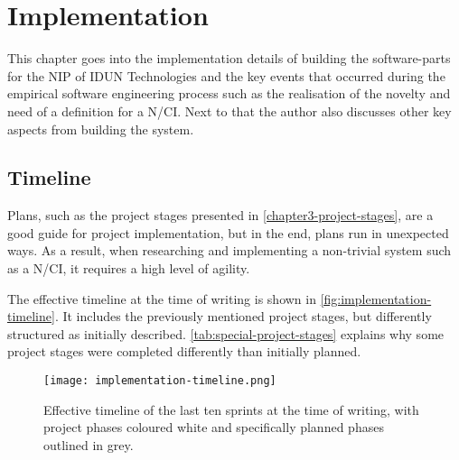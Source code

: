 \chapter{Implementation}
\graphicspath{{Chapter4/Figs/}{Chapter4/Figs/}}

This chapter goes into the implementation details of building the software-parts for the NIP of IDUN Technologies and the key events that occurred during the empirical software engineering process such as the realisation of the novelty and need of a definition for a N/CI. Next to that the author also discusses other key aspects from building the system.

\section{Timeline}
\label{chapter4-timeline}

Plans, such as the project stages presented in \autoref{chapter3-project-stages}, are a good guide for project implementation, but in the end, plans run in unexpected ways. As a result, when researching and implementing a non-trivial system such as a N/CI, it requires a high level of agility.

The effective timeline at the time of writing is shown in \autoref{fig:implementation-timeline}. It includes the previously mentioned project stages, but differently structured as initially described. \autoref{tab:special-project-stages} explains why some project stages were completed differently than initially planned.

\begin{figure}[!ht]
  \centering
  \texttt{[image: implementation-timeline.png]}
  \caption{Effective timeline of the last ten sprints at the time of writing, with project phases coloured white and specifically planned phases outlined in grey.}
  \label{fig:implementation-timeline}
\end{figure}

